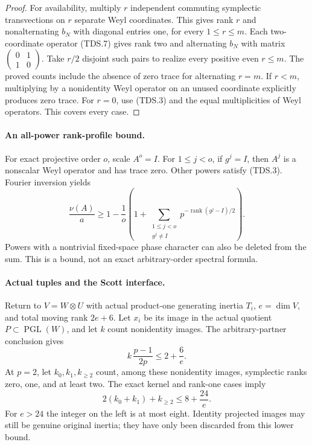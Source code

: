 \begin{proof}
For availability, multiply \(r\) independent commuting symplectic
transvections on \(r\) separate Weyl coordinates.  This gives rank
\(r\) and nonalternating \(b_N\) with diagonal entries one,
for every \(1\le r\le m\).
Each two-coordinate operator (TDS.7) gives rank two and alternating
\(b_N\) with matrix
\(\left(\begin{smallmatrix}0&1\\1&0\end{smallmatrix}\right)\).
Take \(r/2\) disjoint such pairs to realize every positive even
\(r\le m\).
The proved counts include the absence of zero trace for alternating
\(r=m\).  If \(r<m\), multiplying by a nonidentity Weyl operator
on an unused coordinate explicitly produces zero trace.
For \(r=0\), use (TDS.3) and the equal multiplicities of Weyl operators.
This covers every case.
\end{proof}

\paragraph{An all-power rank-profile bound.}
For exact projective order \(o\), scale \(A^o=I\).
For \(1\le j<o\), if \(g^j=I\), then \(A^j\) is a nonscalar Weyl
operator and has trace zero.  Other powers satisfy (TDS.3).
Fourier inversion yields
\[
 \frac{\nu(A)}a\ge
 1-\frac1o\left(1+
       \sum_{\substack{1\le j<o\\g^j\ne I}}
                 p^{-\operatorname{rank}(g^j-I)/2}\right).
 \tag{TDS.18}
\]
Powers with a nontrivial fixed-space phase character can also be
deleted from the sum.  This is a bound, not an exact arbitrary-order
spectral formula.

\paragraph{Actual tuples and the Scott interface.}
Return to \(V=W\otimes U\) with actual product-one generating inertia
\(T_i\), \(e=\dim V\), and total moving rank \(2e+6\).
Let \(x_i\) be its image in the actual quotient
\(P\subset\operatorname{PGL}(W)\), and let \(k\) count nonidentity images.
The arbitrary-partner conclusion gives
\[
                         k\,\frac{p-1}{2p}\le2+\frac6e.
 \tag{TDS.19}
\]
At \(p=2\), let \(k_0,k_1,k_{\ge2}\) count, among these nonidentity
images, symplectic ranks zero, one, and at least two.
The exact kernel and rank-one cases imply
\[
                         2(k_0+k_1)+k_{\ge2}\le8+\frac{24}e.
 \tag{TDS.20}
\]
For \(e>24\) the integer on the left is at most eight.
Identity projected images may still be genuine original inertia;
they have only been discarded from this lower bound.


